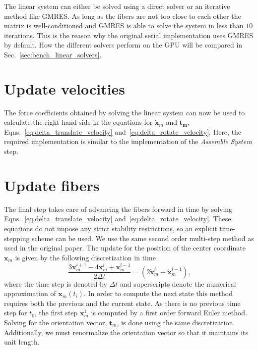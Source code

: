 The linear system can either be solved using a direct solver or an iterative method like GMRES. As long as the fibers are not too close to each other the matrix is well-conditioned and GMRES is able to solve the system in less than $10$ iterations. This is the reason why the original serial implementation uses GMRES by default. How the different solvers perform on the GPU will be compared in Sec.~\ref{sec:bench_linear_solvers}.

\section{Update velocities}

The force coefficients obtained by solving the linear system can now be used to calculate the right hand side in the  equations for $\mathbf{\dot{x}}_m$ and $\mathbf{\dot{t}_m}$, Eqns.~\eqref{eq:delta_translate_velocity} and~\eqref{eq:delta_rotate_velocity}. Here, the required implementation is similar to the implementation of the \emph{Assemble System} step.

\section{Update fibers}
\label{sec:serial_update_fibers}

The final step takes care of advancing the fibers forward in time by solving Eqns.~\eqref{eq:delta_translate_velocity} and~\eqref{eq:delta_rotate_velocity}. These equations do not impose any strict stability restrictions, so an explicit time-stepping scheme can be used. We use the same second order multi-step method as used in the original paper. The update for the position of the center coordinate $\mathbf{x}_m$ is given by the following discretization in time
\begin{equation}
  \label{eq:time_discretization}
  \frac{3\mathbf{x}_m^{i+1} - 4\mathbf{x}_m^{i} + \mathbf{x}_m^{i-1}}{2 \Delta t} = (2\mathbf{\dot{x}}_m^{i} - \mathbf{\dot{x}}_m^{i-1}) \text{,}
\end{equation}
where the time step is denoted by $\Delta t$ and superscripts denote the numerical approximation of $\mathbf{x}_m(t_i)$. In order to compute the next state this method requires both the previous and the current state. As there is no previous time step for $t_0$, the first step $\mathbf{x}_{m}^{1}$ is computed by a first order forward Euler method. Solving for the orientation vector, $\mathbf{t}_m$, is done using the same discretization. Additionally, we must renormalize the orientation vector so that it maintains its unit length.

